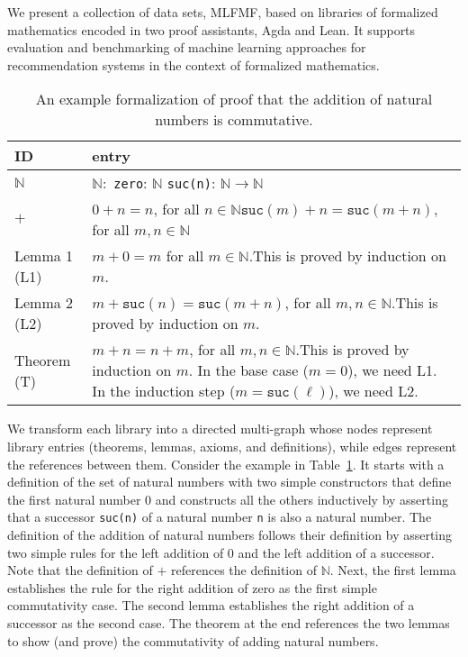 \documentclass{article}
\begin{document}
We present a collection of data sets, MLFMF, based on libraries of formalized mathematics encoded in two proof assistants, Agda %
and Lean. %
It supports evaluation and benchmarking of machine learning approaches for recommendation systems in the context of formalized mathematics.

\begin{table}[!htb]
    \centering
    \begin{tabular}{l| p{10cm}}
       ID  & entry  \\
       \hline
       $\mathbb{N}$   & $\mathbb{N}:$ \newline \hphantom{oo}\texttt{zero}: $\mathbb{N}$ \newline\hphantom{oo}\texttt{suc(n)}: $\mathbb{N}\to \mathbb{N}$ \\
       \hline %
       $+$  & $0 + n = n$, for all $n\in \mathbb{N}$\newline $\texttt{suc}(m) + n = \texttt{suc}(m + n)$, for all $m, n\in \mathbb{N}$ \\ %
       \hline
       Lemma 1 (L1) & $m + 0 = m$ for all $m\in \mathbb{N}$.\newline This is proved by induction on $m$. \\  %
       \hline
       Lemma 2 (L2) & $m + \texttt{suc}(n) = \texttt{suc}(m + n)$, for all $m, n\in\mathbb{N}$.\newline This is proved by induction on $m$. \\ %
       \hline
       Theorem (T) & $m + n = n + m$, for all $m, n\in \mathbb{N}$.\newline This is proved by induction on $m$. In the base case ($m = 0$), we need L1.
       In the induction step ($m = \texttt{suc}(\ell)$), we need L2. %
    \end{tabular}
    \caption{An example formalization of proof that the addition of natural numbers is commutative.}
    \label{tab:example}
\end{table}

We transform each library into a directed multi-graph whose nodes represent library entries (theorems, lemmas, axioms, and definitions), while edges represent the references between them. Consider the example in Table~\ref{tab:example}. It starts with a definition of the set of natural numbers with two simple constructors that define the first natural number 0 and constructs all the others inductively by asserting that a successor \texttt{suc(n)} of a natural number \texttt{n} is also a natural number. The definition of the addition of natural numbers follows their definition by asserting two simple rules for the left addition of 0 and the left addition of a successor. Note that the definition of $+$ references the definition of $\mathbb{N}$. Next, the first lemma establishes the rule for the right addition of zero as the first simple commutativity case. The second lemma establishes the right addition of a successor as the second case. The theorem at the end references the two lemmas to show (and prove) the commutativity of adding natural numbers.
\end{document}
